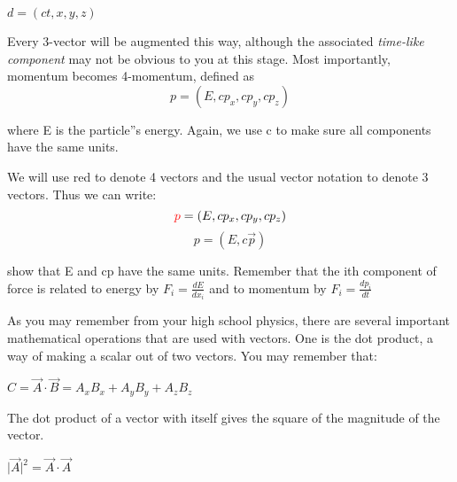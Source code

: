 	  $d=(ct,x,y,z)$


\noindent Every 3-vector will be augmented this way, although the associated {\it time-like component} may not be obvious to you at this stage.  Most importantly, momentum becomes 4-momentum, defined as
\begin{equation}  
p=(E,cp_x, cp_y, cp_z)  
\end{equation}

where E is the particle''s energy. Again, we use c to make sure all components have the same units.
	 
We will use red to denote 4 vectors and the usual vector notation to denote 3 vectors.  Thus we can write:
\begin{equation} 
\textcolor{red}{p}=(E,cp_x, cp_y, cp_z)  
\end{equation}  		   
\begin{equation} 
p=(E,c\vec{p})  
\end{equation} 
	
\vspace{.2cm} 
\begin{minipage}{0.9\textwidth} 
\begin{framed}
\begin{exercise}
{show that E and cp have the same units. Remember that the ith component of force is related to energy by $F_i = \frac{dE}{dx_i}$ and to momentum by $F_i = \frac{dp_i}{dt}$}
\end{exercise}
\end{framed} 
\end{minipage}
\vspace{.2cm}



As you may remember from your high school physics, there are several important mathematical operations that are used with vectors.  One is the dot product, a way of making a scalar out of two vectors.  You may remember that:

      $ C= \vec A \cdot \vec B = A_xB_x +A_yB_y +A_zB_z $

The dot product of a vector with itself gives the square of the magnitude of the vector.
      
     $|{\vec{A}|^2} =\vec A \cdot \vec A  $
	  
